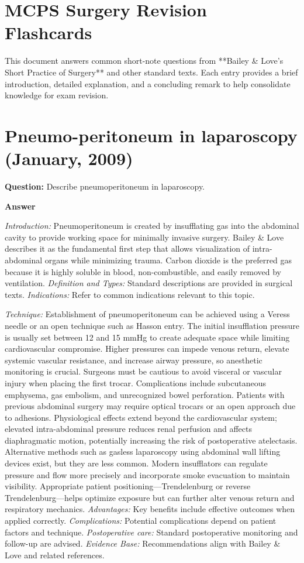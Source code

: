 \documentclass{article}
\begin{document}
\section*{MCPS Surgery Revision Flashcards}

This document answers common short-note questions from **Bailey \& Love's Short Practice of Surgery** and other standard texts. Each entry provides a brief introduction, detailed explanation, and a concluding remark to help consolidate knowledge for exam revision.


\section{Pneumo-peritoneum in laparoscopy (January, 2009)}

\textbf{Question:} Describe pneumoperitoneum in laparoscopy.

\textbf{Answer}

\emph{Introduction:} Pneumoperitoneum is created by insufflating gas into the abdominal cavity to provide working space for minimally invasive surgery. Bailey \& Love describes it as the fundamental first step that allows visualization of intra-abdominal organs while minimizing trauma. Carbon dioxide is the preferred gas because it is highly soluble in blood, non-combustible, and easily removed by ventilation.
\emph{Definition and Types:} Standard descriptions are provided in surgical texts.
\emph{Indications:} Refer to common indications relevant to this topic.

\emph{Technique:} Establishment of pneumoperitoneum can be achieved using a Veress needle or an open technique such as Hasson entry. The initial insufflation pressure is usually set between 12 and 15 mmHg to create adequate space while limiting cardiovascular compromise. Higher pressures can impede venous return, elevate systemic vascular resistance, and increase airway pressure, so anesthetic monitoring is crucial. Surgeons must be cautious to avoid visceral or vascular injury when placing the first trocar. Complications include subcutaneous emphysema, gas embolism, and unrecognized bowel perforation. Patients with previous abdominal surgery may require optical trocars or an open approach due to adhesions. Physiological effects extend beyond the cardiovascular system; elevated intra-abdominal pressure reduces renal perfusion and affects diaphragmatic motion, potentially increasing the risk of postoperative atelectasis. Alternative methods such as gasless laparoscopy using abdominal wall lifting devices exist, but they are less common. Modern insufflators can regulate pressure and flow more precisely and incorporate smoke evacuation to maintain visibility. Appropriate patient positioning—Trendelenburg or reverse Trendelenburg—helps optimize exposure but can further alter venous return and respiratory mechanics.
\emph{Advantages:} Key benefits include effective outcomes when applied correctly.
\emph{Complications:} Potential complications depend on patient factors and technique.
\emph{Postoperative care:} Standard postoperative monitoring and follow-up are advised.
\emph{Evidence Base:} Recommendations align with Bailey \& Love and related references.
\end{document}

